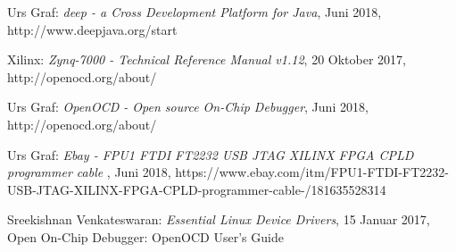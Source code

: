 \begingroup
\renewcommand{\chapter}[2]{\section#1{#2}}%
\begin{thebibliography}{99}


	Urs Graf:
	\emph{deep - a Cross Development Platform for Java},
	Juni 2018, http://www.deepjava.org/start


	Xilinx:
	\emph{Zynq-7000 - Technical Reference Manual v1.12},
	20 Oktober 2017, http://openocd.org/about/

	Urs Graf:
	\emph{OpenOCD - Open source On-Chip Debugger},
	Juni 2018, http://openocd.org/about/

	Urs Graf:
	\emph{Ebay - FPU1 FTDI FT2232 USB JTAG XILINX FPGA CPLD programmer cable },
	Juni 2018, https://www.ebay.com/itm/FPU1-FTDI-FT2232-USB-JTAG-XILINX-FPGA-CPLD-programmer-cable-/181635528314
	
	Sreekishnan Venkateswaran:
	\emph{Essential Linux Device Drivers},
	15 Januar 2017, Open On-Chip Debugger: OpenOCD User's Guide






	\end{thebibliography}
\endgroup